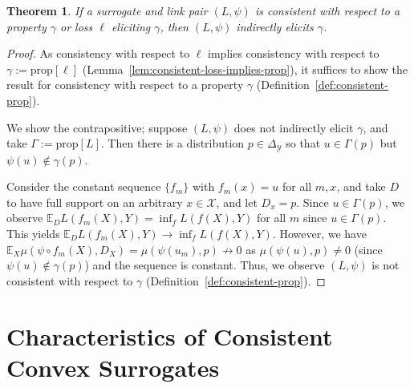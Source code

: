 \documentclass{article}
\newcommand{\Comments}{1}
\newcommand{\mynote}[2]{\ifnum\Comments=1\textcolor{#1}{#2}\fi}
\newcommand{\mytodo}[2]{\ifnum\Comments=1%
	\todo[linecolor=#1!80!black,backgroundcolor=#1,bordercolor=#1!80!black]{#2}\fi}
\newcommand{\raft}[1]{\mytodo{green!20!white}{RF: #1}}
\newcommand{\jessie}[1]{\mynote{purple}{[JF: #1]}}
\newcommand{\reals}{\mathbb{R}}
\newcommand{\simplex}{\Delta_\Y}
\newcommand{\prop}[1]{\mathrm{prop}[#1]}
\newcommand{\propdis}{\mu}
\newcommand{\E}{\mathbb{E}}
\newcommand{\X}{\mathcal{X}}
\newcommand{\Y}{\mathcal{Y}}
\newtheorem{theorem}{Theorem}
\begin{document}
\begin{theorem}\label{thm:consistent-implies-indir-elic}
	If a surrogate and link pair $(L, \psi)$ is consistent with respect to a property $\gamma$ or loss $\ell$ eliciting $\gamma$, then $(L, \psi)$ indirectly elicits $\gamma$.
\end{theorem}
\begin{proof}
	As consistency with respect to $\ell$ implies consistency with respect to $\gamma := \prop{\ell}$ (Lemma~\ref{lem:consistent-loss-implies-prop}), it suffices to show the result for consistency with respect to a property $\gamma$ (Definition~\ref{def:consistent-prop}).
  
	We show the contrapositive; suppose $(L, \psi)$ does not indirectly elicit $\gamma$, and take $\Gamma := \prop{L}$.
	Then there is a distribution $p \in \simplex$ so that $u \in \Gamma(p)$ but $\psi(u) \not \in \gamma(p)$.

	Consider the constant sequence $\{f_m\}$ with $f_m(x) = u$ for all $m,x$, and take $D$ to have full support on an arbitrary $x \in \X$, and let $D_x = p$.
  	Since $u \in \Gamma(p)$, we observe $\E_D L(f_m(X), Y) = \inf_f L(f(X),Y)$ for all $m$ since $u \in \Gamma(p)$.
	This yields $\E_D L(f_m(X), Y) \to \inf_f L(f(X),Y)$.
	However, we have $\E_X \propdis(\psi \circ f_m(X), D_X) = \propdis(\psi(u_m), p) \not \to 0$ as $\propdis(\psi(u), p) \neq 0$ (since $\psi(u) \not \in \gamma(p)$) and the sequence is constant.
	Thus, we observe $(L, \psi)$ is not consistent with respect to $\gamma$ (Definition~\ref{def:consistent-prop}).
\end{proof}

\section{Characteristics of Consistent Convex Surrogates}\label{sec:char-convex}
\end{document}
